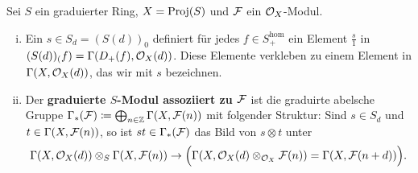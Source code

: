 \begin{defn}
\label{defn:11.13}
	Sei $S$ ein graduierter Ring, $X=\operatorname{Proj}(S)$ und $\mathcal{F}$ ein $\mathcal{O}_X$-Modul.
	\begin{enumerate}[i)]
		\item Ein $s \in S_d=(S(d))_0$ definiert für jedes $f \in S_+^\text{hom}$ ein Element $\frac{s}{1}$ in $(S(d))_(f) = \Gamma(D_+(f),\mathcal{O}_X(d))$. Diese Elemente verkleben zu einem Element in $\Gamma(X,\mathcal{O}_X(d))$, das wir mit $s$ bezeichnen.
		\item Der \textbf{graduierte $S$-Modul assoziiert zu $\mathcal{F}$} ist die graduirte abelsche Gruppe $\Gamma_*(\mathcal{F})\coloneqq \bigoplus_{n\in \mathbb {Z}}\Gamma(X,\mathcal{F}(n))$ mit folgender Struktur: Sind $s \in S_d$ und $t \in \Gamma(X,\mathcal{F}(n))$, so ist $st \in \Gamma_*(\mathcal{F})$ das Bild von $s \otimes t$ unter
		\[
		 	\Gamma(X,\mathcal{O}_X(d))\otimes_S \Gamma(X,\mathcal{F}(n)) \to \Big(\Gamma(X,\mathcal{O}_X(d)\otimes_{\mathcal{O}_X}\mathcal{F}(n)) = \Gamma(X,\mathcal{F}(n+d))\Big).
		 \] 
	\end{enumerate}
	
\end{defn}


